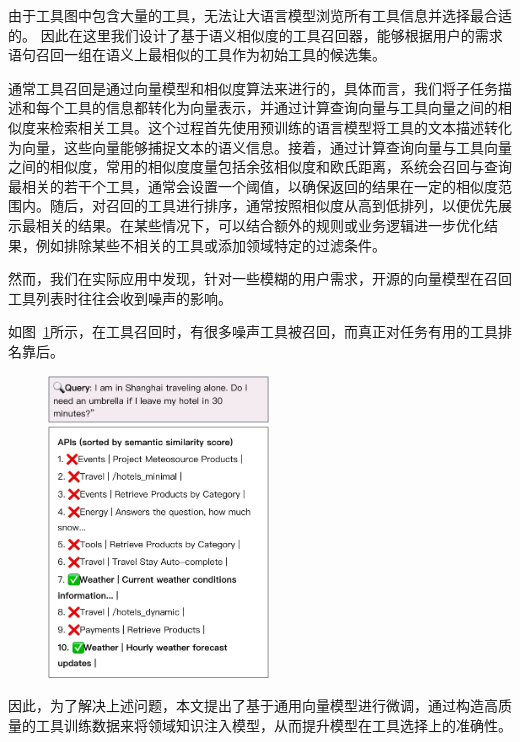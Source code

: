 由于工具图中包含大量的工具，无法让大语言模型浏览所有工具信息并选择最合适的。
因此在这里我们设计了基于语义相似度的工具召回器，能够根据用户的需求语句召回一组在语义上最相似的工具作为初始工具的候选集。

通常工具召回是通过向量模型和相似度算法来进行的，具体而言，我们将子任务描述和每个工具的信息都转化为向量表示，并通过计算查询向量与工具向量之间的相似度来检索相关工具。这个过程首先使用预训练的语言模型将工具的文本描述转化为向量，这些向量能够捕捉文本的语义信息。接着，通过计算查询向量与工具向量之间的相似度，常用的相似度度量包括余弦相似度和欧氏距离，系统会召回与查询最相关的若干个工具，通常会设置一个阈值，以确保返回的结果在一定的相似度范围内。随后，对召回的工具进行排序，通常按照相似度从高到低排列，以便优先展示最相关的结果。在某些情况下，可以结合额外的规则或业务逻辑进一步优化结果，例如排除某些不相关的工具或添加领域特定的过滤条件。

然而，我们在实际应用中发现，针对一些模糊的用户需求，开源的向量模型在召回工具列表时往往会收到噪声的影响。

如图~\ref{fig:why-tune}所示，在工具召回时，有很多噪声工具被召回，而真正对任务有用的工具排名靠后。

\begin{figure}[!htp]
  \vspace{1em}
  \centering
  \setlength{\abovecaptionskip}{10pt} %
  \includegraphics[height=8cm]{../assets/ch3-为何需要微调.pdf}
  \label{fig:why-tune}
\end{figure}

因此，为了解决上述问题，本文提出了基于通用向量模型进行微调，通过构造高质量的工具训练数据来将领域知识注入模型，从而提升模型在工具选择上的准确性。

